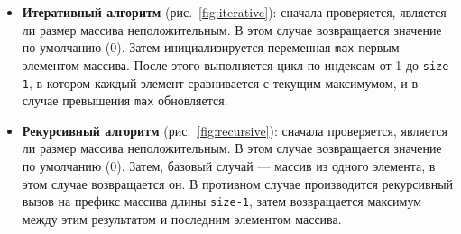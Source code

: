 \begin{itemize}
  \item \textbf{Итеративный алгоритм} (рис.~\ref{fig:iterative}): сначала проверяется, является ли размер массива неположительным. В этом случае возвращается значение по умолчанию (0). Затем инициализируется переменная \texttt{max} первым элементом массива. После этого выполняется цикл по индексам от 1 до \texttt{size-1}, в котором каждый элемент сравнивается с текущим максимумом, и в случае превышения \texttt{max} обновляется.
  
  \item \textbf{Рекурсивный алгоритм} (рис.~\ref{fig:recursive}): сначала проверяется, является ли размер массива неположительным. В этом случае возвращается значение по умолчанию (0). Затем, базовый случай — массив из одного элемента, в этом случае возвращается он. В противном случае производится рекурсивный вызов на префикс массива длины \texttt{size-1}, затем возвращается максимум между этим результатом и последним элементом массива.
\end{itemize}
